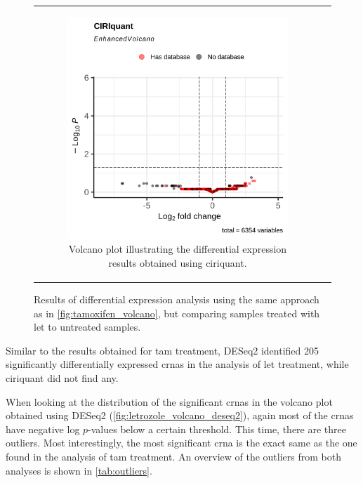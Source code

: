 \begin{figure}[H]
\begin{tabular}{cc}
\begin{subfigure}{0.5\textwidth}
            \includegraphics[width=\linewidth]{chapters/4_results_and_discussion/figures/dea/ciriquant/letrozole/volcano.png}
            \caption{Volcano plot illustrating the differential expression
                results obtained using \gls{ciriquant}.
            }
            \label{fig:letrozole_volcano_ciriquant}
        \end{subfigure} &

    \end{tabular}
    \caption{Results of differential expression analysis using the same
        approach as in
        \cref{fig:tamoxifen_volcano}, but comparing samples treated with
        \gls{let}
        to untreated samples.
    }
    \label{fig:letrozole_volcano}
\end{figure}

Similar to the results obtained for \gls{tam} treatment, DESeq2 identified 205
significantly differentially expressed \glspl{crna} in the analysis of
\gls{let} treatment, while \gls{ciriquant} did not find any.

When looking at the distribution of the significant \glspl{crna} in the volcano
plot obtained using DESeq2 (\cref{fig:letrozole_volcano_deseq2}), again most of
the \glspl{crna} have negative log $p$-values below a certain threshold.
This time, there are three outliers.
Most interestingly, the most significant \gls{crna} is the exact same as the
one found in the analysis of \gls{tam} treatment.
An overview of the outliers from both analyses is shown in \cref{tab:outliers}.

